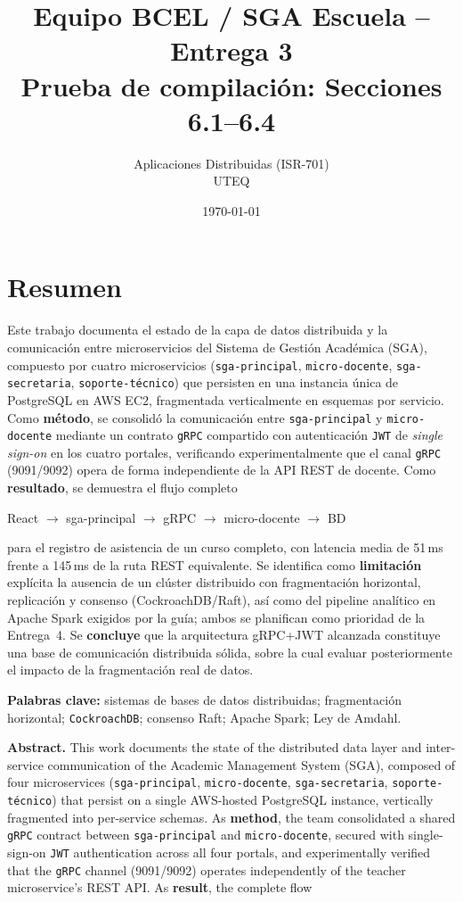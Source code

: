 \documentclass[12pt,a4paper]{article}
\title{Equipo BCEL / SGA Escuela -- Entrega 3\\ Prueba de compilaci\'on: Secciones 6.1--6.4}
\author{Aplicaciones Distribuidas (ISR-701) \\ UTEQ}
\date{\today}
\newcommand{\flujo}[1]{%
  \begin{center}
  \small\ttfamily #1
  \end{center}%
}
\begin{document}
\maketitle
\tableofcontents
\newpage

\section{Resumen}
\label{sec:resumen}


Este trabajo documenta el estado de la capa de datos distribuida y la
comunicación entre microservicios del Sistema de Gestión Académica (SGA),
compuesto por cuatro microservicios (\texttt{sga-principal},
\texttt{micro-docente}, \texttt{sga-secretaria}, \texttt{soporte-técnico})
que persisten en una instancia única de PostgreSQL en AWS EC2, fragmentada
verticalmente en esquemas por servicio. Como \textbf{método}, se consolidó
la comunicación entre \texttt{sga-principal} y \texttt{micro-docente}
mediante un contrato \texttt{gRPC} compartido con autenticación \texttt{JWT}
de \emph{single sign-on} en los cuatro portales, verificando
experimentalmente que el canal \texttt{gRPC} (9091/9092) opera de forma
independiente de la API REST de docente. Como \textbf{resultado}, se
demuestra el flujo completo

\flujo{React $\to$ sga-principal $\to$ gRPC $\to$ micro-docente $\to$ BD}

\noindent para el registro de asistencia de un curso completo, con latencia
media de 51\,ms frente a 145\,ms de la ruta REST equivalente. Se identifica
como \textbf{limitación} explícita la ausencia de un clúster distribuido con
fragmentación horizontal, replicación y consenso (CockroachDB/Raft), así
como del pipeline analítico en Apache Spark exigidos por la guía; ambos se
planifican como prioridad de la Entrega~4. Se \textbf{concluye} que la
arquitectura gRPC+JWT alcanzada constituye una base de comunicación
distribuida sólida, sobre la cual evaluar posteriormente el impacto de la
fragmentación real de datos.

\medskip
\noindent\textbf{Palabras clave:} sistemas de bases de datos distribuidas;
fragmentación horizontal; \texttt{CockroachDB}; consenso Raft;
Apache Spark; Ley de Amdahl.

\medskip
\noindent\textbf{Abstract.} This work documents the state of the
distributed data layer and inter-service communication of the Academic
Management System (SGA), composed of four microservices
(\texttt{sga-principal}, \texttt{micro-docente}, \texttt{sga-secretaria},
\texttt{soporte-técnico}) that persist on a single AWS-hosted PostgreSQL
instance, vertically fragmented into per-service schemas. As
\textbf{method}, the team consolidated a shared \texttt{gRPC} contract
between \texttt{sga-principal} and \texttt{micro-docente}, secured with
single-sign-on \texttt{JWT} authentication across all four portals, and
experimentally verified that the \texttt{gRPC} channel (9091/9092) operates
independently of the teacher microservice's REST API. As \textbf{result},
the complete flow
\end{document}

